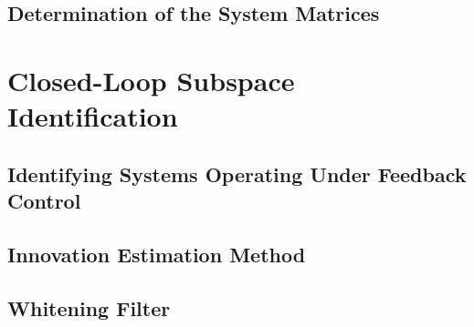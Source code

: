 \subsection{Determination of the System Matrices}




\section{Closed-Loop Subspace Identification}



\subsection{Identifying Systems Operating Under Feedback Control}

\subsection{Innovation Estimation Method}

\subsection{Whitening Filter}
